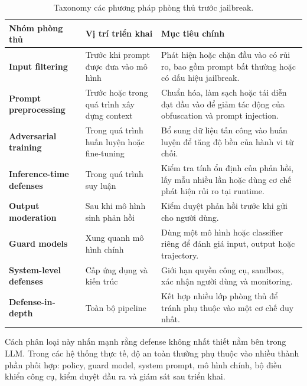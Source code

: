 \begin{table}[H]
\centering
\caption{Taxonomy các phương pháp phòng thủ trước jailbreak.}
\label{tab:jailbreak-defense-taxonomy}
\begin{tabularx}{\textwidth}{
    >{\bfseries}p{}
    p{}
    X
}
\toprule
Nhóm phòng thủ
& Vị trí triển khai
& Mục tiêu chính \\
\midrule

Input filtering
& Trước khi prompt được đưa vào mô hình
& Phát hiện hoặc chặn đầu vào có rủi ro, bao gồm prompt bất thường hoặc
có dấu hiệu jailbreak. \\

Prompt preprocessing
& Trước hoặc trong quá trình xây dựng context
& Chuẩn hóa, làm sạch hoặc tái diễn đạt đầu vào để giảm tác động của
obfuscation và prompt injection. \\

Adversarial training
& Trong quá trình huấn luyện hoặc fine-tuning
& Bổ sung dữ liệu tấn công vào huấn luyện để tăng độ bền của hành vi từ
chối. \\

Inference-time defenses
& Trong quá trình suy luận
& Kiểm tra tính ổn định của phản hồi, lấy mẫu nhiều lần hoặc dùng cơ chế
phát hiện rủi ro tại runtime. \\

Output moderation
& Sau khi mô hình sinh phản hồi
& Kiểm duyệt phản hồi trước khi gửi cho người dùng. \\

Guard models
& Xung quanh mô hình chính
& Dùng một mô hình hoặc classifier riêng để đánh giá input, output hoặc
trajectory. \\

System-level defenses
& Cấp ứng dụng và kiến trúc
& Giới hạn quyền công cụ, sandbox, xác nhận người dùng và monitoring. \\

Defense-in-depth
& Toàn bộ pipeline
& Kết hợp nhiều lớp phòng thủ để tránh phụ thuộc vào một cơ chế duy nhất. \\

\bottomrule
\end{tabularx}
\end{table}

Cách phân loại này nhấn mạnh rằng defense không nhất thiết nằm bên trong
LLM. Trong các hệ thống thực tế, độ an toàn thường phụ thuộc vào nhiều
thành phần phối hợp: policy, guard model, system prompt, mô hình chính,
bộ điều khiển công cụ, kiểm duyệt đầu ra và giám sát sau triển khai.

